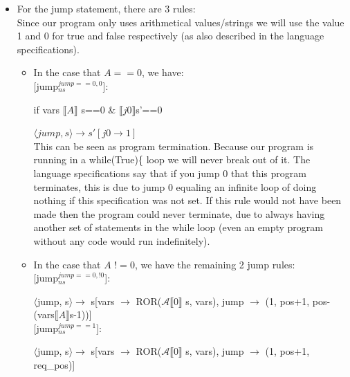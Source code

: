 \documentclass{article}
\begin{document}
\begin{itemize}
\item For the jump statement, there are 3 rules:\\

Since our program only uses arithmetical values/strings we will use the value 1 and 0 for true and false respectively (as also described in the language specifications).\\

\begin{itemize}
    \item In the case that $A == 0$, we have:\\
    
{[jump$_{ns}^{jump == 0,0}$]}:

if vars $\llbracket A\rrbracket$ s==0 \& $\llbracket j0\rrbracket$s'==0

$\langle jump,s\rangle \rightarrow s'[j0 \rightarrow 1]$\\

This can be seen as program termination. Because our program is running in a while(True)\{ loop we will never break out of it. The language specifications say that if you jump 0 that this program terminates, this is due to jump 0 equaling an infinite loop of doing nothing if this specification was not set. If this rule would not have been made then the program could never terminate, due to always having another set of statements in the while loop (even an empty program without any code would run indefinitely).\\

\item In the case that $A$ $!= 0$, we have the remaining 2 jump rules:\\ 

{[jump$_{ns}^{jump == 0,!0}$]}:

$\langle$jump, s$\rangle \rightarrow$ s[vars $\rightarrow$ ROR($\mathscr{A}$$\llbracket 0\rrbracket$ s, vars), jump $\rightarrow$ (1, pos+1, pos-(vars$\llbracket A\rrbracket$s-1))]\\

{[jump$_{ns}^{jump == 1}$]}:

$\langle$jump, s$\rangle \rightarrow$ s[vars $\rightarrow$ ROR($\mathscr{A}$$\llbracket 0\rrbracket$ s, vars), jump $\rightarrow$ (1, pos+1, req\_pos)]\\
\end{itemize}


\end{itemize}
\end{document}
